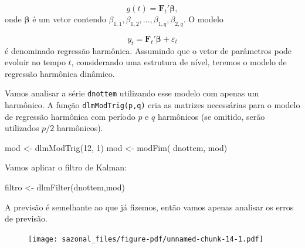 \documentclass[
  letterpaper,
  DIV=11,
  numbers=noendperiod]{scrreprt}
\newenvironment{Shaded}{\begin{snugshade}}{\end{snugshade}}
\newcommand{\DecValTok}[1]{\textcolor[rgb]{0.68,0.00,0.00}{#1}}
\newcommand{\FunctionTok}[1]{\textcolor[rgb]{0.28,0.35,0.67}{#1}}
\newcommand{\NormalTok}[1]{\textcolor[rgb]{0.00,0.23,0.31}{#1}}
\newcommand{\OtherTok}[1]{\textcolor[rgb]{0.00,0.23,0.31}{#1}}
\newcommand{\SpecialCharTok}[1]{\textcolor[rgb]{0.37,0.37,0.37}{#1}}
\begin{document}
\[g(t)=\boldsymbol{F}_t'\boldsymbol{\beta},\] onde
\(\boldsymbol{\beta}\) é um vetor contendo
\(\beta_{1,1},\beta_{1,2},\ldots,\beta_{1,q},\beta_{2,q}\). O modelo

\[y_t= \boldsymbol{F}_t'\boldsymbol{\beta}+\varepsilon_t\] é denominado
regressão harmônica. Assumindo que o vetor de parâmetros pode evoluir no
tempo \(t\), considerando uma estrutura de nível, teremos o modelo de
regressão harmônica dinâmico.

Vamos analisar a série \texttt{dnottem} utilizando esse modelo com
apenas um harmônico. A função \texttt{dlmModTrig(p,q)} cria as matrizes
necessárias para o modelo de regressão harmônica com período \(p\) e
\(q\) harmônicos (se omitido, serão utilizados \(p/2\) harmônicos).

\begin{Shaded}
\begin{Highlighting}[]
\NormalTok{mod }\OtherTok{\textless{}{-}} \FunctionTok{dlmModTrig}\NormalTok{(}\DecValTok{12}\NormalTok{, }\DecValTok{1}\NormalTok{)}
\NormalTok{mod }\OtherTok{\textless{}{-}} \FunctionTok{modFim}\NormalTok{( dnottem, mod)}
\end{Highlighting}
\end{Shaded}

Vamos aplicar o filtro de Kalman:

\begin{Shaded}
\begin{Highlighting}[]
\NormalTok{filtro }\OtherTok{\textless{}{-}} \FunctionTok{dlmFilter}\NormalTok{(dnottem,mod)}
\end{Highlighting}
\end{Shaded}

A previsão é semelhante ao que já fizemos, então vamos apenas analisar
os erros de previsão.

\begin{Shaded}
\end{Shaded}

\begin{figure}[H]

{\centering \texttt{[image: sazonal\_files/figure-pdf/unnamed-chunk-14-1.pdf]}

}

\end{figure}
\end{document}
